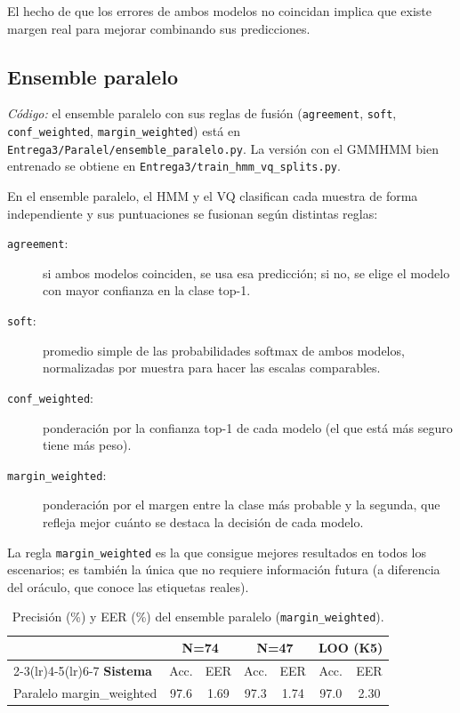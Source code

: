 \documentclass[11pt,a4paper]{article}
\begin{document}
El hecho de que los errores de ambos modelos no coincidan implica que existe
margen real para mejorar combinando sus predicciones.

\subsection{Ensemble paralelo}

\textit{C\'{o}digo:} el ensemble paralelo con sus reglas de fusi\'{o}n
(\texttt{agreement}, \texttt{soft}, \texttt{conf\_weighted},
\texttt{margin\_weighted}) est\'{a} en
\texttt{Entrega3/Paralel/ensemble\_paralelo.py}. La versi\'{o}n con el
GMMHMM bien entrenado se obtiene en
\texttt{Entrega3/train\_hmm\_vq\_splits.py}.

En el ensemble paralelo, el HMM y el VQ clasifican cada muestra de forma
independiente y sus puntuaciones se fusionan seg\'{u}n distintas reglas:

\begin{description}
  \item[\texttt{agreement}:] si ambos modelos coinciden, se usa esa predicci\'{o}n;
       si no, se elige el modelo con mayor confianza en la clase top-1.
  \item[\texttt{soft}:] promedio simple de las probabilidades softmax de ambos
       modelos, normalizadas por muestra para hacer las escalas comparables.
  \item[\texttt{conf\_weighted}:] ponderaci\'{o}n por la confianza top-1 de cada
       modelo (el que est\'{a} m\'{a}s seguro tiene m\'{a}s peso).
  \item[\texttt{margin\_weighted}:] ponderaci\'{o}n por el margen entre la clase
       m\'{a}s probable y la segunda, que refleja mejor cu\'{a}nto se destaca la
       decisi\'{o}n de cada modelo.
\end{description}

La regla \texttt{margin\_weighted} es la que consigue mejores resultados en todos
los escenarios; es tambi\'{e}n la \'{u}nica que no requiere informaci\'{o}n futura
(a diferencia del or\'{a}culo, que conoce las etiquetas reales).

\begin{table}[H]
  \centering
  \caption{Precisi\'{o}n (\%) y EER (\%) del ensemble paralelo (\texttt{margin\_weighted}).}
  \label{tab:par}
  \begin{tabular}{lcccccc}
    \toprule
    & \multicolumn{2}{c}{\textbf{N=74}} & \multicolumn{2}{c}{\textbf{N=47}}
    & \multicolumn{2}{c}{\textbf{LOO (K5)}} \\
    \cmidrule(lr){2-3}\cmidrule(lr){4-5}\cmidrule(lr){6-7}
    \textbf{Sistema} & Acc. & EER & Acc. & EER & Acc. & EER \\
    \midrule
    Paralelo margin\_weighted & 97.6 & 1.69 & 97.3 & 1.74 & 97.0 & 2.30 \\
    \bottomrule
  \end{tabular}
\end{table}
\end{document}
